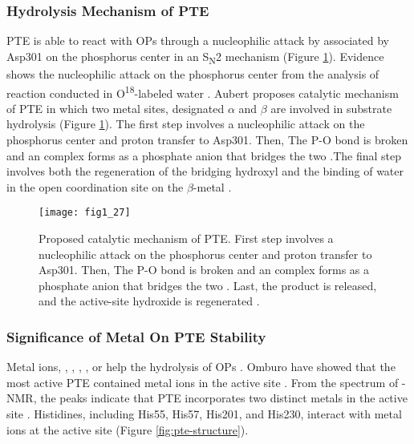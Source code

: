 \begin{refsection}
\subsubsection{Hydrolysis Mechanism of PTE}

PTE is able to react with OPs through a nucleophilic attack by 
associated by Asp301 on the phosphorus center in an S\textsubscript{N}2
mechanism \cite{Lewis1988} (Figure \ref{fig:pte-mechanism}).  Evidence shows
the nucleophilic attack on the phosphorus center from the analysis of reaction
conducted in O\textsuperscript{18}-labeled water \cite{Lewis1988}.  Aubert
 proposes catalytic mechanism of PTE in which two metal sites,
designated $\alpha$ and $\beta$ are involved in substrate hydrolysis
\cite{Aubert2004} (Figure \ref{fig:pte-mechanism}). The first step involves a
nucleophilic attack on the phosphorus center and proton transfer to Asp301.
Then, The P-O bond is broken and an complex forms as a phosphate anion that
bridges the two .The final step involves both the regeneration of
the bridging hydroxyl and the binding of water in the open coordination site on
the $\beta$-metal \cite{Aubert2004}.
\begin{figure}[htbp] \centering \texttt{[image: fig1\_27]}
    \caption[Proposed catalytic mechanism of PTE. First step involves a
    nucleophilic attack on the phosphorus center and proton transfer to Asp301.
Then, The P-O bond is broken and an complex forms as a phosphate anion that
bridges the two . Last, the product is released, and the
active-site hydroxide is regenerated.]{Proposed catalytic mechanism of PTE.
    First step involves a nucleophilic attack on the phosphorus center and
    proton transfer to Asp301. Then, The P-O bond is broken and an complex
    forms as a phosphate anion that bridges the two . Last, the
    product is released, and the active-site hydroxide is regenerated
    \cite{Aubert2004}.} \label{fig:pte-mechanism} \end{figure}

\subsubsection{Significance of Metal On PTE Stability}

Metal ions, , , , , or
 help the hydrolysis of OPs
\cite{Rochu2002b,Carletti2009,Hill2003,Bigley2013,Samples2005,Kim2008}. Omburo
 have showed that the most active PTE contained  metal
ions in the active site \cite{Omburo1992a}. From the spectrum of
-NMR, the peaks indicate that PTE incorporates two distinct metals
in the active site \cite{Omburo1993}.  Histidines, including His55, His57,
His201, and His230, interact with metal ions at the active site
\cite{Benning2001a} (Figure \ref{fig:pte-structure}). 


\end{refsection}
